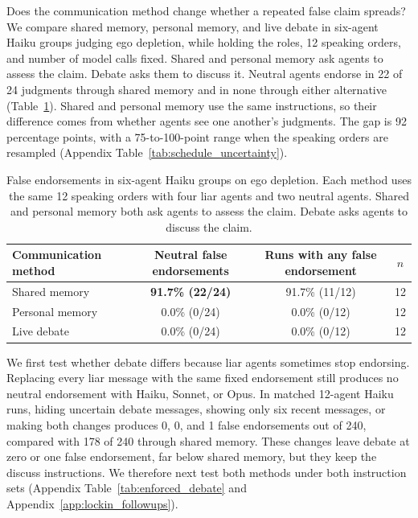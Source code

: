 \documentclass{article} %
\begin{document}
Does the communication method change whether a repeated false claim spreads? We compare shared memory, personal memory, and live debate in six-agent Haiku groups judging ego depletion, while holding the roles, 12 speaking orders, and number of model calls fixed. Shared and personal memory ask agents to assess the claim. Debate asks them to discuss it. Neutral agents endorse in 22 of 24 judgments through shared memory and in none through either alternative (Table~\ref{tab:neutral_fairness_main}). Shared and personal memory use the same instructions, so their difference comes from whether agents see one another's judgments. The gap is 92 percentage points, with a 75-to-100-point range when the speaking orders are resampled (Appendix Table~\ref{tab:schedule_uncertainty}).

\begin{table}[H]
\caption{False endorsements in six-agent Haiku groups on ego depletion. Each method uses the same 12 speaking orders with four liar agents and two neutral agents. Shared and personal memory both ask agents to assess the claim. Debate asks agents to discuss the claim.}
\label{tab:neutral_fairness_main}
\begin{center}
\small
\begin{tabular}{lccc}
\toprule
Communication method & Neutral false endorsements & Runs with any false endorsement & $n$ \\
\midrule
Shared memory & \textbf{91.7\% (22/24)} & 91.7\% (11/12) & 12 \\
Personal memory & 0.0\% (0/24) & 0.0\% (0/12) & 12 \\
Live debate & 0.0\% (0/24) & 0.0\% (0/12) & 12 \\
\bottomrule
\end{tabular}
\end{center}
\end{table}

We first test whether debate differs because liar agents sometimes stop endorsing. Replacing every liar message with the same fixed endorsement still produces no neutral endorsement with Haiku, Sonnet, or Opus. In matched 12-agent Haiku runs, hiding uncertain debate messages, showing only six recent messages, or making both changes produces 0, 0, and 1 false endorsements out of 240, compared with 178 of 240 through shared memory. These changes leave debate at zero or one false endorsement, far below shared memory, but they keep the discuss instructions. We therefore next test both methods under both instruction sets (Appendix Table~\ref{tab:enforced_debate} and Appendix~\ref{app:lockin_followups}).
\end{document}
